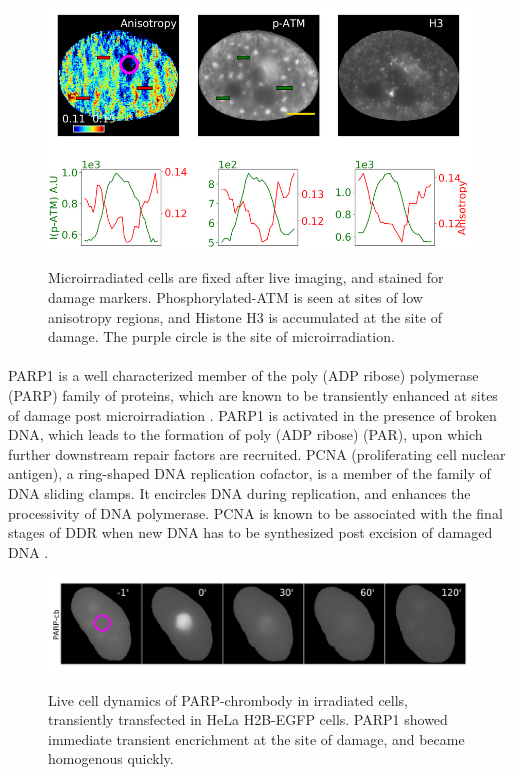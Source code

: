 \begin{figure}[!htp]
    {\hfill\includegraphics[clip, width=1\linewidth]{figures/patm.png}\hspace*{\fill}}
    \caption{Microirradiated cells are fixed after live imaging, and stained for damage markers. Phosphorylated-ATM is seen at sites of low anisotropy regions, and Histone H3 is accumulated at the site of damage. The purple circle is the site of microirradiation.}
    {\label{fig:patm}}
\end{figure}

\paragraph*{} PARP1 is a well characterized member of the poly (ADP ribose) polymerase (PARP) family of proteins, which are known to be transiently enhanced at sites of damage post microirradiation \cite{chou2010chromatin, qi2019multiple}. PARP1 is activated in the presence of broken DNA, which leads to the formation of poly (ADP ribose) (PAR), upon which further downstream repair factors are recruited. PCNA (proliferating cell nuclear antigen), a ring-shaped DNA replication cofactor, is a member of the family of DNA sliding clamps. It encircles DNA during replication, and enhances the processivity of DNA polymerase. PCNA is known to be associated with the final stages of DDR when new DNA has to be synthesized post excision of damaged DNA \cite{moldovan2007pcna}.

\begin{figure}[H]
    {\hfill\includegraphics[clip, width=1\linewidth]{figures/parp.png}\hspace*{\fill}}
    \caption{Live cell dynamics of PARP-chrombody in irradiated cells, transiently transfected in HeLa H2B-EGFP cells. PARP1 showed immediate transient encrichment at the site of damage, and became homogenous quickly.}
    {\label{fig:parp}}
\end{figure}


